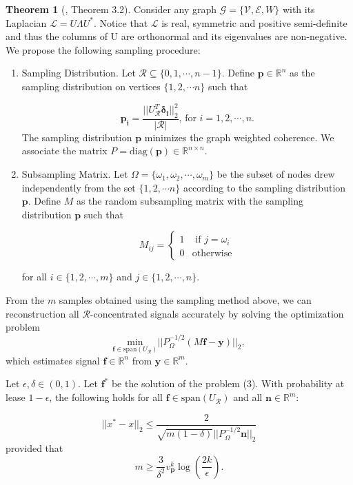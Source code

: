 \documentclass[a4paper]{article}
\newcommand{\R}{\mathcal{R}}
\newcommand{\RR}{\mathbb{R}}
\newcommand{\G}{\mathcal{G}}
\newcommand{\V}{\mathcal{V}}
\newcommand{\E}{\mathcal{E}}
\newcommand{\La}{\mathcal{L}}
\newcommand{\UR}{U_{\mathcal{R}}}
\newcommand{\vv}{\mathit{v}}
\theoremstyle{definition}
\newtheorem*{thm}{Theorem}
\begin{document}
\begin{thm}[\cite{puy}, Theorem 3.2]
Consider any graph $\G = \{\V, \E, W\}$ with its Laplacian $\La = U\Lambda U^*$. Notice that $\La$ is real, symmetric and positive semi-definite and thus the columns of U are orthonormal and its eigenvalues are non-negative. We propose the following sampling procedure:

\begin{enumerate}

\item Sampling Distribution. Let $\R \subseteq \{0,1,\cdots, n-1\}$. Define $\bm{p} \in \RR^n$ as the sampling distribution on vertices $\{1,2, \cdots n\}$  such that 

\[\bm{p_i} = \frac{||U^T_\R\bm{\delta_i}||^2_2}{|\R|} \text{, for } i = 1,2 ,\cdots, n. \tag{1}\]  
The sampling distribution $\bm{p}$ minimizes the graph weighted coherence. We associate the matrix $P = \text{diag}(\bm{p}) \in \RR^{n\times n}$.

\item Subsampling Matrix. Let $\Omega = \{\omega_1, \omega_2, \cdots, \omega_m\}$ be the subset of nodes drew independently from the set $\{1,2,\cdots n\}$ according to the sampling distribution $\bm{p}$. Define $M$ as the random subsampling matrix with the sampling distribution $\bm{p}$ such that

\[M_{ij} = 
\begin{cases} 
      1 & \text{ if } j = \omega_{i}\\
      0 & \text{otherwise}
   \end{cases}
\tag{2}\] 

for all $i \in \{1,2,\cdots,m\}$ and $j \in \{1,2,\cdots, n\}$.

\end{enumerate}

\medskip

From the $m$ samples obtained using the sampling method above, we can reconstruction all $\R$-concentrated signals accurately by solving the optimization problem 
\[\underset{\bm{f} \in \text{span}(\UR)}{\text{min}}\vert\vert P^{-1/2}_\Omega (M\bm{f}-\bm{y})\vert\vert_2, \tag{3}\] 
which estimates signal $\bm{f} \in \RR^n$ from $\bm{y} \in \RR^m$. 

Let $\epsilon, \delta \in (0,1)$. Let $\bm{f^*}$ be the solution of the problem (3). With probability at lease $1-\epsilon$, the following holds for all $\bm{f}\in \text{span}(U_{\R})$ and all $\bm{n}\in \RR^m: $

\[||x^* - x||_2 \leq \frac{2}{\sqrt{m(1-\delta)} ||P_{\Omega}^{-1/2} \bm{n}||_2} \tag{4}\]
provided that \[m \geq \frac{3}{\delta^2}\vv^k_{\bm{p}}\log(\frac{2k}{\epsilon}). \tag{5} \]

\end{thm}
\end{document}
